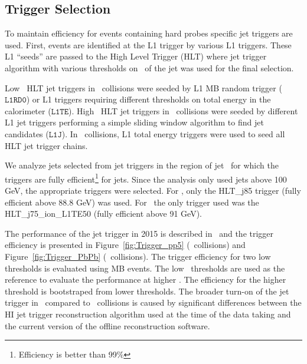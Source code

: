 \subsection{Trigger Selection}



To maintain efficiency for events containing hard probes specific jet triggers are used.
First, events are identified at the L1 trigger by various L1 triggers.
These L1 ``seeds'' are passed to the High Level Trigger (HLT) where jet trigger algorithm with various thresholds on \pT\ of the jet was used for the final selection.


Low \pT\ HLT jet triggers in \pp\ collisions were seeded by L1 MB random trigger ($\texttt{L1RD0}$) or L1 triggers requiring different thresholds on total energy in the calorimeter ($\texttt{L1TE}$).
High \pT\ HLT jet triggers in \pp\ collisions were seeded by different L1 jet triggers performing a simple sliding window algorithm to find jet candidates ($\texttt{L1J}$).
In \PbPb\ collisions, L1 total energy triggers were used to seed all HLT jet trigger chains.

We analyze jets selected from jet triggers in the region of jet \pt\ for which the triggers are fully efficient\footnote{Efficiency is better than 99\%} for jets.
Since the analysis only used jets above 100 GeV, the appropriate triggers were selected.
For \pp, only the {\footnotesize{HLT\_j85}} trigger (fully efficient above 88.8 GeV) was used.
For \pbpb\, the only trigger used was the {\footnotesize{HLT\_j75\_ion\_L1TE50}} (fully efficient above 91 GeV).
   
The performance of the jet trigger in 2015 is described in~\cite{HITMF} and the trigger efficiency is presented in Figure~\ref{fig:Trigger_pp5} (\pp\ collisions) and Figure~\ref{fig:Trigger_PbPb} (\pbpb\ collisions).
The trigger efficiency for two low thresholds is evaluated using MB events.
The low \pT\ thresholds are used as the reference to evaluate the performance at higher \pT.
The efficiency for the higher threshold is bootstraped from lower thresholds.
The broader turn-on of the jet trigger in \pbpb\ compared to \pp\ collisions is caused by significant differences between the HI jet trigger reconstruction algorithm used at the time of the data taking and the current version of the offline reconstruction software.

